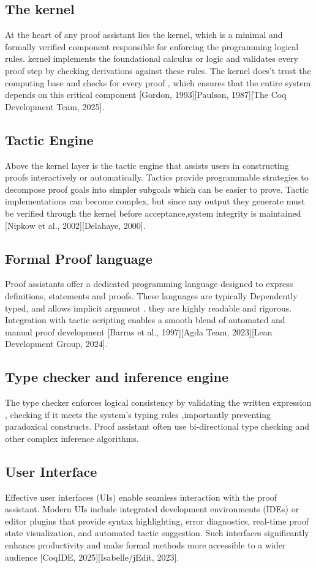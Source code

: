 \documentclass[12pt]{article}
\begin{document}
\subsection{The kernel} 
At the heart of any proof assistant lies the kernel, which is a minimal and formally verified component responsible for enforcing the programming logical rules. kernel implements the foundational calculus or logic and validates every proof
step by checking derivations against these rules. The kernel does't trust the computing base and checks for every proof , which ensures that the entire system depends on this critical component [Gordon, 1993][Paulson, 1987][The Coq Development Team, 2025].
\subsection{Tactic Engine}
Above the kernel layer is the tactic engine that assists users in constructing proofs interactively or automatically.
Tactics provide programmable strategies to decompose proof goals into simpler subgoals which can be easier to prove. 
Tactic implementations can become complex, but since any output they generate must be verified through the
kernel before acceptance,system integrity is maintained [Nipkow et al., 2002][Delahaye, 2000]. 


\subsection{Formal Proof language}
Proof assistants offer a dedicated programming language designed to express definitions, statements and proofs. These languages are typically Dependently typed,
and allows implicit argument . they are highly readable and rigorous. Integration with tactic scripting enables a smooth blend of automated and manual proof development [Barras et al.,
1997][Agda Team, 2023][Lean Development Group, 2024].

\subsection{Type checker and inference engine}
The type checker enforces logical consistency by validating the written expression , checking if it meets the system's typing
rules ,importantly preventing paradoxical constructs. Proof assistant often use bi-directional type checking and other 
complex inference algorithms.

\subsection{User Interface} 
Effective user interfaces (UIs) enable seamless interaction with the proof assistant. 
Modern UIs include integrated development environments (IDEs) or editor plugins that provide syntax highlighting, error diagnostics, real-time proof state visualization,
and automated tactic suggestion. Such interfaces significantly enhance productivity and make formal methods more accessible to a wider audience [CoqIDE, 2025][Isabelle/jEdit, 2023].
\end{document}
